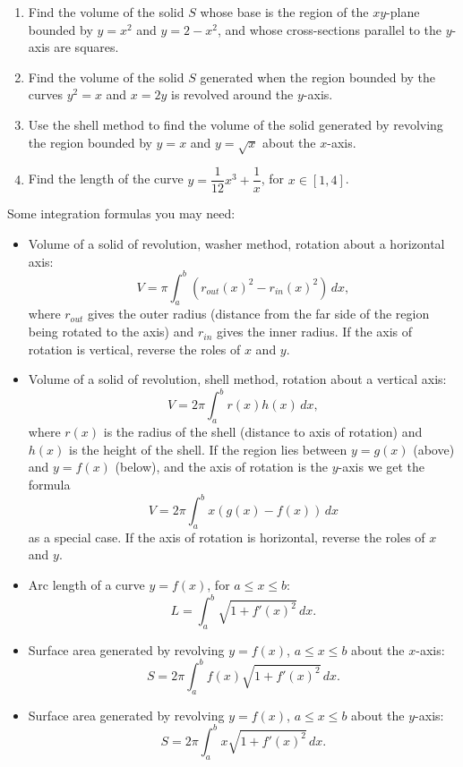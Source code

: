 \documentclass[12pt]{article}
\begin{document}
\newpage





 \begin{enumerate}



 \item Find the volume of the solid $S$ whose base is the region of the $xy$-plane bounded by $y=x^2$ and $y=2-x^2$, and whose cross-sections parallel to the $y$-axis are squares.
 
 \vspace{4in}
 
 \item Find the volume of the solid $S$ generated when the region bounded by the curves $y^2=x$ and $x=2y$ is revolved around the $y$-axis.

\newpage

 \item Use the shell method to find the volume of the solid generated by revolving the region bounded by $y=x$ and $y=\sqrt{x}$ about the $x$-axis.
 
 \vspace{4in} 
 
 \item Find the length of the curve $y=\dfrac{1}{12}x^3+\dfrac{1}{x}$, for $x\in [1,4]$.

\end{enumerate}
\newpage

Some integration formulas you may need:

\begin{itemize}
 \item Volume of a solid of revolution, washer method, rotation about a horizontal axis: 
\[
 V = \pi\int_a^b (r_{out}(x)^2-r_{in}(x)^2)\,dx,
\]
where $r_{out}$ gives the outer radius (distance from the far side of the region being rotated to the axis) and $r_{in}$ gives the inner radius. If the axis of rotation is vertical, reverse the roles of $x$ and $y$.



 \item Volume of a solid of revolution, shell method, rotation about a vertical axis:
\[
 V = 2\pi\int_a^b r(x)h(x)\,dx,
\]
where $r(x)$ is the radius of the shell (distance to axis of rotation) and $h(x)$ is the height of the shell. If the region lies between $y=g(x)$ (above) and $y=f(x)$ (below), and the axis of rotation is the $y$-axis we get the formula
\[
 V = 2\pi \int_a^b x(g(x)-f(x))\,dx
\]
as a special case. If the axis of rotation is horizontal, reverse the roles of $x$ and $y$.

\item Arc length of a curve $y=f(x)$, for $a\leq x\leq b$:
\[
 L = \int_a^b\sqrt{1+f'(x)^2}\,dx.
\]
\item Surface area generated by revolving $y=f(x)$, $a\leq x\leq b$ about the $x$-axis:
\[
 S = 2\pi\int_a^b f(x)\sqrt{1+f'(x)^2}\,dx.
\]
\item Surface area generated by revolving $y=f(x)$, $a\leq x\leq b$ about the $y$-axis:
\[
 S = 2\pi\int_a^b x\sqrt{1+f'(x)^2}\,dx.
\]

\end{itemize}
\end{document}
